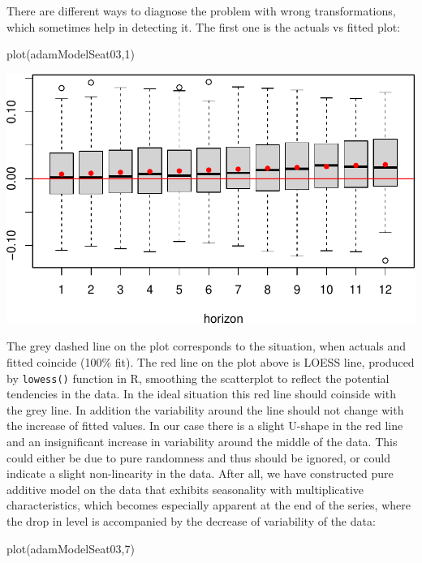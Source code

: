 \documentclass[
]{book}
\newenvironment{Shaded}{\begin{snugshade}}{\end{snugshade}}
\newcommand{\DecValTok}[1]{\textcolor[rgb]{0.00,0.00,0.81}{#1}}
\newcommand{\FunctionTok}[1]{\textcolor[rgb]{0.00,0.00,0.00}{#1}}
\newcommand{\NormalTok}[1]{#1}
\theoremstyle{definition}
\theoremstyle{definition}
\theoremstyle{definition}
\theoremstyle{definition}
\theoremstyle{remark}
\begin{document}
There are different ways to diagnose the problem with wrong transformations, which sometimes help in detecting it. The first one is the actuals vs fitted plot:

\begin{Shaded}
\begin{Highlighting}[]
\FunctionTok{plot}\NormalTok{(adamModelSeat03,}\DecValTok{1}\NormalTok{)}
\end{Highlighting}
\end{Shaded}

\includegraphics{adam_files/figure-latex/unnamed-chunk-130-1.pdf}

The grey dashed line on the plot corresponds to the situation, when actuals and fitted coincide (100\% fit). The red line on the plot above is LOESS line, produced by \texttt{lowess()} function in R, smoothing the scatterplot to reflect the potential tendencies in the data. In the ideal situation this red line should coinside with the grey line. In addition the variability around the line should not change with the increase of fitted values. In our case there is a slight U-shape in the red line and an insignificant increase in variability around the middle of the data. This could either be due to pure randomness and thus should be ignored, or could indicate a slight non-linearity in the data. After all, we have constructed pure additive model on the data that exhibits seasonality with multiplicative characteristics, which becomes especially apparent at the end of the series, where the drop in level is accompanied by the decrease of variability of the data:

\begin{Shaded}
\begin{Highlighting}[]
\FunctionTok{plot}\NormalTok{(adamModelSeat03,}\DecValTok{7}\NormalTok{)}
\end{Highlighting}
\end{Shaded}
\end{document}
